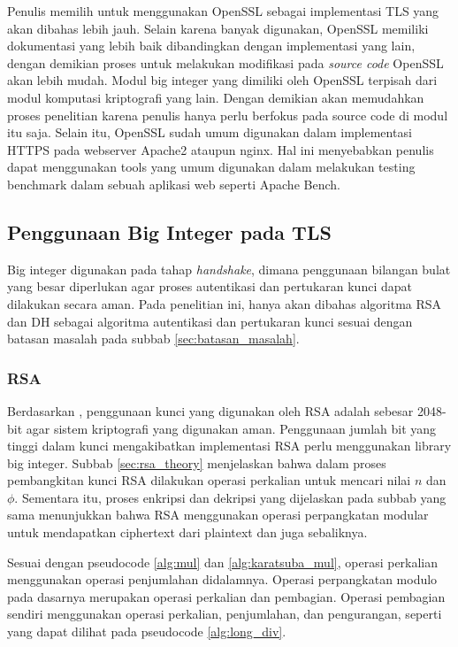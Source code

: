     Penulis memilih untuk menggunakan OpenSSL sebagai implementasi TLS yang akan dibahas lebih jauh. Selain karena banyak digunakan, OpenSSL memiliki dokumentasi yang lebih baik dibandingkan dengan implementasi yang lain, dengan demikian proses untuk melakukan modifikasi pada \textit{source code} OpenSSL akan lebih mudah. Modul big integer yang dimiliki oleh OpenSSL terpisah dari modul komputasi kriptografi yang lain. Dengan demikian akan memudahkan proses penelitian karena penulis hanya perlu berfokus pada source code di modul itu saja. Selain itu, OpenSSL sudah umum digunakan dalam implementasi HTTPS pada webserver Apache2 ataupun nginx. Hal ini menyebabkan penulis dapat menggunakan tools yang umum digunakan dalam melakukan testing benchmark dalam sebuah aplikasi web seperti Apache Bench.

  \subsection{Penggunaan Big Integer pada TLS}
    Big integer digunakan pada tahap \textit{handshake}, dimana penggunaan bilangan bulat yang besar diperlukan agar proses autentikasi dan pertukaran kunci dapat dilakukan secara aman. Pada penelitian ini, hanya akan dibahas algoritma RSA dan DH sebagai algoritma autentikasi dan pertukaran kunci sesuai dengan batasan masalah pada subbab \ref{sec:batasan_masalah}.

    \subsubsection{RSA} \label{sec:rsa_bn_usage}
      Berdasarkan \citet{key_suggestion}, penggunaan kunci yang digunakan oleh RSA adalah sebesar 2048-bit agar sistem kriptografi yang digunakan aman. Penggunaan jumlah bit yang tinggi dalam kunci mengakibatkan implementasi RSA perlu menggunakan library big integer. Subbab \ref{sec:rsa_theory} menjelaskan bahwa dalam proses pembangkitan kunci RSA dilakukan operasi perkalian untuk mencari nilai $n$ dan $\phi$. Sementara itu, proses enkripsi dan dekripsi yang dijelaskan pada subbab yang sama menunjukkan bahwa RSA menggunakan operasi perpangkatan modular untuk mendapatkan ciphertext dari plaintext dan juga sebaliknya.

      Sesuai dengan pseudocode \ref{alg:mul} dan \ref{alg:karatsuba_mul}, operasi perkalian menggunakan operasi penjumlahan didalamnya. Operasi perpangkatan modulo pada dasarnya merupakan operasi perkalian dan pembagian. Operasi pembagian sendiri menggunakan operasi perkalian, penjumlahan, dan pengurangan, seperti yang dapat dilihat pada pseudocode \ref{alg:long_div}.

